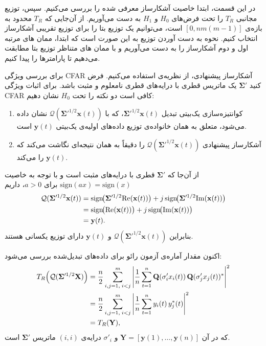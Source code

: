 در این قسمت، ابتدا خاصیت  آشکارساز معرفی شده را بررسی می‌کنیم. سپس، توزیع مجانبی 
$T_R$
را تحت فرض‌های 
$H_0$
و
$H_1$
به دست می‌آوریم. از آن‌جایی که
$T_R$
محدود به بازه‌ی
$[0, nm(m-1)]$
است، می‌توانیم یک توزیع بتا را برای توزیع تقریبی آشکارساز انتخاب کنیم. نحوه به دست آوردن توزیع به این صورت است که ابتدا، ممان های مرتبه اول و دوم آشکارساز را به دست می‌آوریم و با ممان های متناظر توزیع بتا مطابقت می‌دهیم تا پارامترها را پیدا کنیم.

برای بررسی ویژگی CFAR آشکارساز پیشنهادی، از نظریه‌ی  استفاده می‌کنیم.  
فرض کنید 
$\mathbf{\Sigma}'$
یک ماتریس قطری با درایه‌های قطری نامعلوم و مثبت باشد. برای اثبات ویژگی CFAR کافی است دو نکته را تحت $H_{0}$ نشان دهیم:

\begin{enumerate}
	\item کوانتیزه‌سازی یک‌بیتی تبدیل
	$\mathbf{\Sigma}'^{1/2}\mathbf{x}(t)$،
	که با 
	$\mathcal{Q}(\mathbf{\Sigma}'^{1/2}\mathbf{x}(t))$ 
	نشان داده می‌شود، متعلق به همان خانواده‌ی توزیع داده‌های اولیه‌ی یک‌بیتی
	$\mathbf{y}(t)$ 
	است.
	\item آشکارساز پیشنهادی
	 $\mathcal{Q}(\mathbf{\Sigma}'^{1/2}\mathbf{x}(t))$ 
	 را دقیقاً به همان نتیجه‌ای نگاشت می‌کند که
	 $\mathbf{y}(t)$
	 را می‌کند.
\end{enumerate}

از آن‌جا که 
$\mathbf{\Sigma}'$ 
قطری با درایه‌های مثبت است و با توجه به خاصیت
 $\mathrm{sign}(ax)=\mathrm{sign}(x)$
 برای
  $a>0$،
  داریم
\begin{align}
	\mathcal{Q}(\mathbf{\Sigma}'^{1/2}\mathbf{x}(t))
	&=\mathrm{sign}\!\big(\mathbf{\Sigma}'^{1/2}\mathrm{Re}(\mathbf{x}(t))\big)
	+ j\,\mathrm{sign}\!\big(\mathbf{\Sigma}'^{1/2}\mathrm{Im}(\mathbf{x}(t))\big) \notag \\
	&=\mathrm{sign}\!\big(\mathrm{Re}(\mathbf{x}(t))\big)
	+ j\,\mathrm{sign}\!\big(\mathrm{Im}(\mathbf{x}(t))\big) \notag \\
	&=\mathbf{y}(t). \label{eq:cfar1}
\end{align}
بنابراین 
$\mathcal{Q}(\mathbf{\Sigma}'^{1/2}\mathbf{x}(t))$
و 
$\mathbf{y}(t)$
دارای توزیع یکسانی هستند.  

اکنون مقدار آماره‌ی آزمون رائو برای داده‌های تبدیل‌شده بررسی می‌شود:
\begin{align}
	T_{R}\!\left(\mathcal{Q}(\mathbf{\Sigma}'^{1/2}\mathbf{X})\right)
	&=\frac{n}{2}\sum_{i,j=1,\; i<j}^{m}
	\left|\frac{1}{n}\sum_{t=1}^{n}
	\mathbf{Q}(\sigma'_{i}x_{i}(t))\,\mathbf{Q}(\sigma'_{j}x_{j}(t))^{*}\right|^{2} \notag \\
	&=\frac{n}{2}\sum_{i,j=1,\; i<j}^{m}
	\left|\frac{1}{n}\sum_{t=1}^{n}y_{i}(t)\,y_{j}^{*}(t)\right|^{2} \notag \\
	&=T_{R}(\mathbf{Y}), \label{eq:cfar2}
\end{align}
که در آن
$\mathbf{Y}=[\mathbf{y}(1),\ldots,\mathbf{y}(n)]$
و 
$\sigma'_{i}$
درایه‌ی
$(i,i)$ 
ماتریس
$\mathbf{\Sigma}'$ 
است.  

